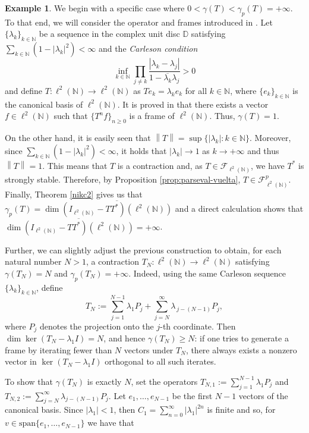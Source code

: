 \documentclass[a4paper,12pt]{amsart}
\def\N{{\mathbb{N}}}
\newcommand{\norm}[1]{{\left\|{#1}\right\|}}
\newcommand{\abs}[1]{{\left|{#1}\right|}}
\theoremstyle{definition}
\newtheorem{example}[theorem]{Example}
\begin{document}
\begin{example}\label{example}
We begin with a specific case where $0<\gamma(T)<\gamma_p(T)=+\infty$. To that end, we will consider the operator and frames introduced in \cite{ACMT}. Let $\{\lambda_k\}_{k\in\N}$ be a sequence in the complex unit disc $\mathbb{D}$ satisfying $\sum_{k\in\N}(1-\abs{\lambda_k}^2)<\infty$ and the {\em Carleson condition}
\begin{equation*}
\inf_{k\in\N}\prod_{j\neq k}\frac{\abs{\lambda_k-\lambda_j}}{1-\overline{\lambda_k}\lambda_j}>0
\end{equation*}
and define $T:\ell^2(\N)\to\ell^2(\N)$ as $Te_k=\lambda_ke_k$ for all $k\in\N$, where $\{e_k\}_{k\in\N}$ is the canonical basis of $\ell^2(\N)$. It is proved in \cite[Theorem 3.6]{ACMT} that there exists a vector $f\in\ell^2(\N)$ such that $\{T^nf\}_{n\geqslant0}$ is a frame of $\ell^2(\N)$. Thus, $\gamma (T)=1$. 

On the other hand, it is easily seen that $\norm{T}=\sup\{\abs{\lambda_k}:k\in\N\}$. Moreover, since $\sum_{k\in\N}(1-\abs{\lambda_k}^2)<\infty$, it holds that $|\lambda_k|\to 1$ as $k\to+\infty$ and thus $\norm{T}=1$. This means that $T$ is a contraction and, as $T\in\mathcal F_{\ell^2(\N)}$, we have $T^*$ is strongly stable. Therefore, by Proposition \ref{prop:parseval-vuelta}, $T\in\mathcal{F}^p_{\ell^2(\N)}$. Finally, Theorem \ref{nikc2} gives us that $\gamma_p(T)=\dim\overline{(I_{\ell^2(\N)}-TT^*)(\ell^2(\N))}$ and a direct calculation shows that $\dim\overline{(I_{\ell^2(\N)}-TT^*)(\ell^2(\N))}=+\infty$.


Further, we can slightly adjust the previous construction to obtain, for 
each natural number $N>1$, a contraction $T_N:\ell^2(\N)\to\ell^2(\N)$ 
satisfying $\gamma(T_N)=N$ and $\gamma_p(T_N)=+\infty$. Indeed, using the 
same Carleson sequence $\{\lambda_k\}_{k\in\N}$, define
\[
    T_N
    :=\sum_{j=1}^{N-1}\lambda_1 P_j
     +\sum_{j=N}^{\infty}\lambda_{\,j-(N-1)} P_j,
\]
where $P_j$ denotes the projection onto the $j$-th coordinate. Then 
$\dim\ker(T_N-\lambda_1 I)=N$, and hence $\gamma(T_N)\ge N$: if one tries 
to generate a frame by iterating fewer than $N$ vectors under $T_N$, there 
always exists a nonzero vector in $\ker(T_N-\lambda_1 I)$ orthogonal to 
all such iterates.

To show that $\gamma(T_N)$ is exactly $N$, set the operators $T_{N,1}:=\sum_{j=1}^{N-1}\lambda_1P_j$ and $T_{N,2}:=\sum_{j=N}^\infty\lambda_{j-(N-1)}P_j$. Let $e_1,\dots,e_{N-1}$ be the first $N-1$ vectors of the canonical basis. Since $\abs{\lambda_1}<1$, then $C_1=\sum_{n=0}^\infty\abs{\lambda_1}^{2n}$ is finite and so, for $v\in\text{span}\{e_1,\dots,e_{N-1}\}$ we have that 


\end{example}
\end{document}
